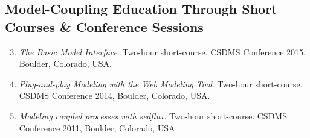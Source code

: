\documentclass[letterpaper]{resume}
\begin{document}
\subsection {Model-Coupling Education Through Short Courses \& Conference Sessions}
\begin{enumerate}
  \setcounter{enumi}{2}
  \item \textit {The Basic Model Interface}. Two-hour short-course. CSDMS Conference 2015, Boulder, Colorado, USA.
  \item \textit {Plug-and-play Modeling with the Web Modeling Tool}. Two-hour short-course. CSDMS Conference 2014, Boulder, Colorado, USA.
  \item \textit {Modeling coupled processes with sedflux}. Two-hour short-course. CSDMS Conference 2011, Boulder, Colorado, USA.
\end{enumerate}


\end{document}
